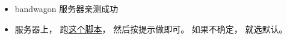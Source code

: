 
\begin{issues}
\issueDraft
\end{issues}

\begin{itemize}
\item bandwagon 服务器亲测成功
\item 服务器上， 跑\href{https://github.com/MacroUniverse/openvpn-install/blob/master/openvpn-install.sh}{这个脚本}， 然后按提示做即可。 如果不确定， 就选默认。
\end{itemize}
